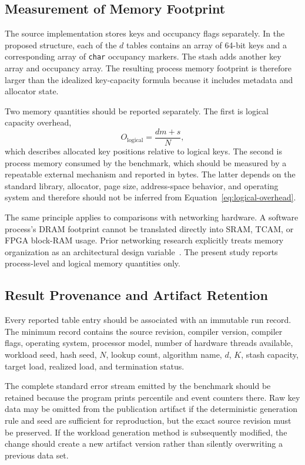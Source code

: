 \documentclass[conference]{IEEEtran}
\begin{document}
\subsection{Measurement of Memory Footprint}

The source implementation stores keys and occupancy flags separately. In the
proposed structure, each of the $d$ tables contains an array of 64-bit keys and a
corresponding array of \texttt{char} occupancy markers. The stash adds another
key array and occupancy array. The resulting process memory footprint is
therefore larger than the idealized key-capacity formula because it includes
metadata and allocator state.

Two memory quantities should be reported separately. The first is logical
capacity overhead,
\begin{equation}
    O_{\mathrm{logical}}=\frac{dm+s}{N},
    \label{eq:logical-overhead}
\end{equation}
which describes allocated key positions relative to logical keys. The second
is process memory consumed by the benchmark, which should be measured by a
repeatable external mechanism and reported in bytes. The latter depends on the
standard library, allocator, page size, address-space behavior, and operating
system and therefore should not be inferred from Equation~\eqref{eq:logical-overhead}.

The same principle applies to comparisons with networking hardware. A software
process's DRAM footprint cannot be translated directly into SRAM, TCAM, or FPGA
block-RAM usage. Prior networking research explicitly treats memory organization
as an architectural design variable~\cite{lescouarnec2018cuckoopp,megias2025minimizing}.
The present study reports process-level and logical memory quantities only.

\subsection{Result Provenance and Artifact Retention}

Every reported table entry should be associated with an immutable run record.
The minimum record contains the source revision, compiler version, compiler
flags, operating system, processor model, number of hardware threads available,
workload seed, hash seed, $N$, lookup count, algorithm name, $d$, $K$, stash
capacity, target load, realized load, and termination status.

The complete standard error stream emitted by the benchmark should be retained
because the program prints percentile and event counters there. Raw key data may
be omitted from the publication artifact if the deterministic generation rule
and seed are sufficient for reproduction, but the exact source revision must be
preserved. If the workload generation method is subsequently modified, the
change should create a new artifact version rather than silently overwriting a
previous data set.
\end{document}
